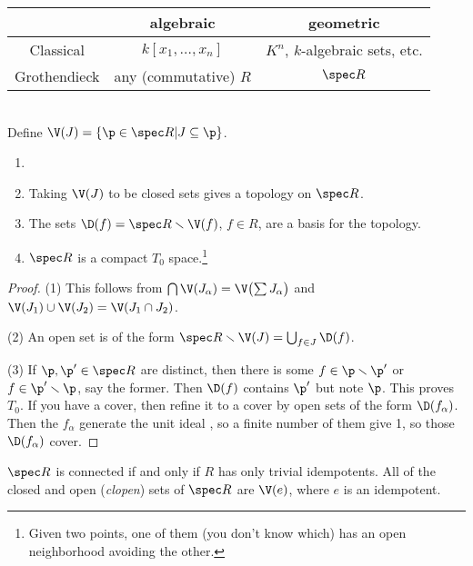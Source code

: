  \begin{tabular}{c|c|c|}
    & algebraic & geometric\\ \hline
   Classical & $k[x_1,\dots, x_n]$ & $K^n$, $k$-algebraic sets, etc. \\ \hline
   Grothendieck & any (commutative) $R$ & $\spec R$
 \end{tabular}\\
 Define $\V(J)=\{\p\in \spec R| J\subseteq \p\}$.
 \begin{theorem}
  \begin{enumerate}\item[]
   \item Taking $\V(J)$ to be closed sets gives a topology on $\spec R$.
   \item The sets $\D(f) = \spec R\smallsetminus \V(f)$, $f\in R$, are a basis for
         the topology.
   \item $\spec R$ is a compact $T_0$ space.\footnote{Given two points, one of them
         (you don't know which) has an open neighborhood avoiding the other.}
  \end{enumerate}
 \end{theorem}
 \begin{proof}
  (1) This follows from $\bigcap \V(J_\alpha)=\V\bigl( \sum J_\alpha \bigr)$ and
  $\V(J_1)\cup \V(J_2)=\V(J_1\cap J_2)$.

  (2) An open set is of the form $\spec R\smallsetminus \V(J) = \bigcup_{f\in J}\D(f)$.

  (3) If $\p,\p'\in \spec R$ are distinct, then there is some $f\in \p\smallsetminus \p'$
  or $f\in \p'\smallsetminus \p$, say the former. Then $\D(f)$ contains $\p'$ but note
  $\p$. This proves $T_0$. If you have a cover, then refine it to a cover by open sets of
  the form $\D(f_\alpha)$. Then the $f_\alpha$ generate the unit ideal \anton{}, so a
  finite number of them give 1, so those $\D(f_\alpha)$ cover.
 \end{proof}
 \setcounter{lecture}{19}

 $\spec R$ is connected if and only if $R$ has only trivial idempotents. All of the
 closed and open (\emph{clopen}) sets of $\spec R$ are $\V(e)$, where $e$ is an
 idempotent.

